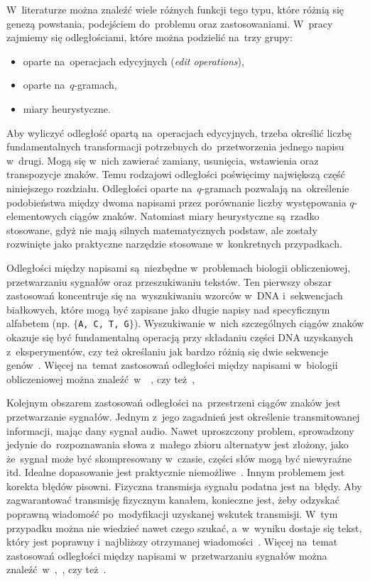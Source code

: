 \documentclass{praca1}
\begin{document}
W~literaturze można znaleźć wiele różnych funkcji tego typu, które różnią się genezą powstania, podejściem do~problemu oraz zastosowaniami. W~pracy zajmiemy się odległościami, które można podzielić na~trzy grupy:
\begin{itemize}
\item oparte na~operacjach edycyjnych (\emph{edit operations}),
\item oparte na~$q$-gramach,
\item miary heurystyczne.
\end{itemize}


Aby wyliczyć odległość opartą na~operacjach edycyjnych, trzeba określić liczbę fundamentalnych transformacji potrzebnych do~przetworzenia jednego napisu w~drugi. Mogą się w~nich zawierać zamiany, usunięcia, wstawienia oraz transpozycje znaków. Temu rodzajowi odległości poświęcimy największą część niniejszego rozdziału. Odległości oparte na~$q$-gramach pozwalają na~określenie podobieństwa między dwoma napisami przez porównanie liczby występowania $q$-elementowych ciągów znaków. Natomiast miary heurystyczne są~rzadko stosowane, gdyż nie mają silnych matematycznych podstaw, ale zostały rozwinięte jako praktyczne narzędzie stosowane w~konkretnych przypadkach. 

Odległości między napisami są~niezbędne w~problemach biologii obliczeniowej, przetwarzaniu sygnałów oraz przeszukiwaniu tekstów. Ten pierwszy obszar zastosowań koncentruje się na~wyszukiwaniu wzorców w~DNA i~sekwencjach białkowych, które mogą być zapisane jako długie napisy nad specyficznym alfabetem (np. $\{$\verb|A, C, T, G|$\}$). Wyszukiwanie w~nich szczególnych ciągów znaków okazuje się być fundamentalną operacją przy składaniu części DNA uzyskanych z~eksperymentów, czy też określaniu jak bardzo różnią się dwie sekwencje genów~\cite{Navarro2001:guidedtour}. Więcej na~temat zastosowań odległości między napisami w~biologii obliczeniowej można znaleźć~w~\cite{Needleman1970:proteins}~\cite{Sankoff1983:timewarps}, czy też~\cite{Sellers1980:evolutionary},

Kolejnym obszarem zastosowań odległości na~przestrzeni ciągów znaków jest przetwarzanie sygnałów. Jednym z~jego zagadnień jest określenie transmitowanej informacji, mając dany sygnał audio. Nawet uproszczony problem, sprowadzony jedynie do~rozpoznawania słowa z~małego zbioru alternatyw jest złożony, jako że~sygnał może być skompresowany w~czasie, części słów mogą być niewyraźne itd. Idealne dopasowanie jest praktycznie niemożliwe~\cite{Navarro2001:guidedtour}. Innym problemem jest korekta błędów pisowni. Fizyczna transmisja sygnału podatna jest na~błędy. Aby zagwarantować transmisję fizycznym kanałem, konieczne jest, żeby odzyskać poprawną wiadomość po~modyfikacji uzyskanej wskutek transmisji. W~tym przypadku można nie wiedzieć nawet czego szukać, a~w~wyniku dostaje się tekst, który jest poprawny i~najbliższy otrzymanej wiadomości~\cite{Navarro2001:guidedtour}. Więcej na~temat zastosowań odległości między napisami w~przetwarzaniu sygnałów można znaleźć~w~\cite{Dixon1979:automatic},~\cite{Levenshtein1965:binarycodes}, czy też~\cite{Vintsyuk1968:speech}.
\end{document}
